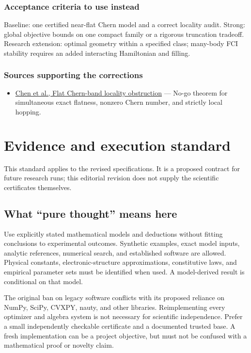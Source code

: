 \documentclass[
  11pt,
]{article}
\providecommand{\tightlist}{%
  \setlength{\itemsep}{0pt}\setlength{\parskip}{0pt}}
\begin{document}
\subsubsection{Acceptance criteria to use instead}

Baseline: one certified near-flat Chern model and a correct locality
audit. Strong: global objective bounds on one compact family or a
rigorous truncation tradeoff. Research extension: optimal geometry
within a specified class; many-body FCI stability requires an added
interacting Hamiltonian and filling.

\subsubsection{Sources supporting the corrections}

\begin{itemize}
\tightlist
\item
  \href{https://arxiv.org/abs/1311.4956}{Chen et al., Flat Chern-band
  locality obstruction} --- No-go theorem for simultaneous exact
  flatness, nonzero Chern number, and strictly local hopping.
\end{itemize}

\section{Evidence and execution standard}

This standard applies to the revised specifications. It is a proposed
contract for future research runs; this editorial revision does not
supply the scientific certificates themselves.

\subsection{What ``pure thought'' means here}

Use explicitly stated mathematical models and deductions without fitting
conclusions to experimental outcomes. Synthetic examples, exact model
inputs, analytic references, numerical search, and established software
are allowed. Physical constants, electronic-structure approximations,
constitutive laws, and empirical parameter sets must be identified when
used. A model-derived result is conditional on that model.

The original ban on legacy software conflicts with its proposed reliance
on NumPy, SciPy, CVXPY, nauty, and other libraries. Reimplementing every
optimizer and algebra system is not necessary for scientific
independence. Prefer a small independently checkable certificate and a
documented trusted base. A fresh implementation can be a project
objective, but must not be confused with a mathematical proof or novelty
claim.
\end{document}
